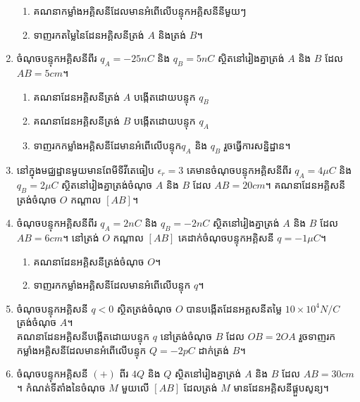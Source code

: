 \begin{enumerate}[m]
	\begin{enumerate}[k]
		\item គណនាកម្លាំងអគ្គិសនីដែលមានអំពើលើបន្ទុកអគ្គិសនីនីមួយៗ
		\item ទាញរកតម្លៃនៃដែនអគ្គិសនីត្រង់ $A$ និងត្រង់ $B$។
	\end{enumerate}
	\item ចំណុចបន្ទុកអគ្គិសនីពីរ $q_{A}=-25nC$ និង $q_{B}=5nC$ ស្ថិតនៅរៀងគ្នាត្រង់ $A$ និង $B$ ដែល $AB=5cm$។ 
	\begin{enumerate}[k]
		\item គណនាដែនអគ្គិសនីត្រង់ $A$ បង្កើតដោយបន្ទុក $q_{B}$
		\item គណនាដែនអគ្គិសនីត្រង់ $B$ បង្កើតដោយបន្ទុក $q_{A}$
		\item ទាញរកកម្លាំងអគ្គិសនីដែមានអំពើលើបន្ទុក​ $q_{A}$ និង $q_{B}$ រួចធ្វើការសន្និដ្ឋាន។
	\end{enumerate}
	\item នៅក្នុងមជ្ឈដ្ឋានមួយមានពែមីទីវីតេធៀប $\epsilon_{r}=3$ គេមានចំណុចបន្ទុកអគ្គិសនីពីរ $q_{A}=4\mu C$ និង $q_{B}=2\mu C$ ស្ថិតនៅរៀងគ្នាត្រង់ចំណុច $A$ និង $B$ ដែល $AB=20cm$។ គណនាដែនអគ្គិសនីត្រង់ចំណុច $O$ កណ្តាល $[AB]$។
	\item ចំណុចបន្ទុកអគ្គិសនីពីរ $q_{A}=2nC$ និង $q_{B}=-2nC$ ស្ថិតនៅរៀងគ្នាត្រង់ $A$ និង $B$ ដែល $AB=6cm$។ នៅត្រង់ $O$ កណ្តាល $[AB]$ គេដាក់ចំណុចបន្ទុកអគ្គិសនី $q=-1\mu C$។
	\begin{enumerate}
		\item គណនាដែនអគ្គិសនីត្រង់ចំណុច $O$។
		\item ទាញរកកម្លាំងអគ្គិសនីដែលមានអំពើលើបន្ទុក $q$។
	\end{enumerate}
	\item ចំណុចបន្ទុកអគ្គិសនី $q<0$ ស្ថិតត្រង់ចំណុច $O$ បានបង្កើតដែនអគ្គសនីតម្លៃ $10\times10^{4}N/C$ ត្រង់ចំណុច $A$។\\
	គណនាដែនអគ្គិសនីបង្កើតដោយបន្ទុក $q$ នៅត្រង់ចំណុច $B$ ដែល $OB=2 OA$ រួចទាញរកកម្លាំងអគ្គិសនីដែលមានអំពើលើបន្ទុក $Q=-2pC$ ដាក់ត្រង់ $B$។ 
	\item ចំណុចបន្ទុកអគ្គិសនី $\left(+\right)$ ពីរ $4Q$ និង $Q$ ស្ថិតនៅរៀងគ្នាត្រង់ $A$ និង $B$ ដែល $AB=30cm$។ កំណត់ទីតាំងនៃចំណុច $M$ មួយលើ $[AB]$ ដែលត្រង់ $M$ មានដែនអគ្គិសនីផ្គួបសូន្យ។  
\end{enumerate}